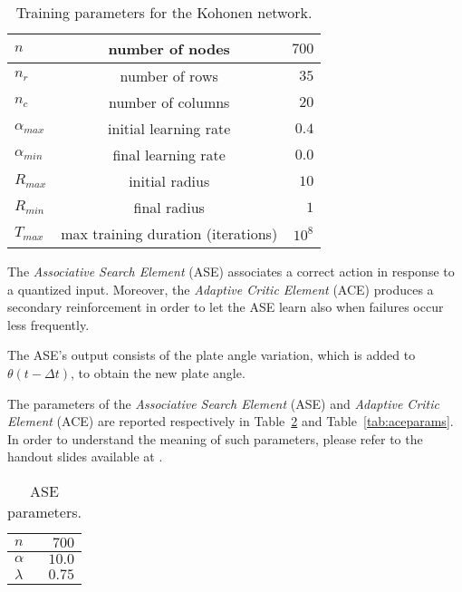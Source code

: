 \begin{table}
  \begin{center}
    \begin{tabular}{| l | c || r | }
      \hline
         $n$            & number of nodes                    & $700$ \\ \hline
         $n_r$          & number of rows                     & $35$  \\ \hline
         $n_c$          & number of columns                  & $20$  \\ \hline
         $\alpha_{max}$ & initial learning rate              & $0.4$ \\ \hline
         $\alpha_{min}$ & final learning rate                & $0.0$ \\ \hline
         $R_{max}$      & initial radius                     & $10$  \\ \hline
         $R_{min}$      & final radius                       & $1$   \\ \hline
         $T_{max}$      & max training duration (iterations) & $10^8$\\ \hline
    \end{tabular}
    \caption{Training parameters for the Kohonen network.}
    \label{tab:kohonenparams}
  \end{center}
\end{table}

The \emph{Associative Search Element} (ASE) associates a correct action in
response to a quantized input.
Moreover, the \emph{Adaptive Critic Element} (ACE) produces a secondary
reinforcement in order to let the ASE learn also when failures occur less
frequently.

The ASE's output consists of the plate angle variation, which is added to 
$\theta (t-\Delta t)$, to obtain the new plate angle.

The parameters of the \emph{Associative Search Element} (ASE) and
\emph{Adaptive Critic Element} (ACE) are reported respectively in
Table~\ref{tab:aseparams} and Table~\ref{tab:aceparams}. In order to
understand the meaning of such parameters, please refer to the handout
slides available at \cite{buttazzos_slides}.

\begin{table}
  \begin{center}
    \begin{tabular}{| l || r | }
      \hline
         $n$            & $700$ \\ \hline
         $\alpha$       & $10.0$ \\ \hline
         $\lambda$      & $0.75$ \\ \hline
    \end{tabular}
    \caption{ASE parameters.}
    \label{tab:aseparams}
  \end{center}
\end{table}

